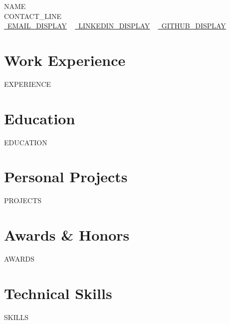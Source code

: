 \documentclass[letterpaper,11pt]{article}
\newcommand{\resumeSubHeadingListStart}{\begin{itemize}[leftmargin=0.0in, label={}]}
\newcommand{\resumeSubHeadingListEnd}{\end{itemize}}
\begin{document}
    \begin{center}
        {\Huge\scshape {{NAME}}}
        \\ {{CONTACT_LINE}}\\
        \small
        \href{{{EMAIL_URL}}}{\raisebox{-0.2\height}\faEnvelope\  \underline{{{EMAIL_DISPLAY}}}} ~
        \href{{{LINKEDIN_URL}}}{\raisebox{-0.2\height}\faLinkedin\ \underline{{{LINKEDIN_DISPLAY}}}}  ~
        \href{{{GITHUB_URL}}}{\raisebox{-0.2\height}\faGithub\ \underline{{{GITHUB_DISPLAY}}}}
    \end{center}

\section{Work Experience}
  \resumeSubHeadingListStart
{{EXPERIENCE}}
  \resumeSubHeadingListEnd

\section{Education}
  \resumeSubHeadingListStart
{{EDUCATION}}
  \resumeSubHeadingListEnd

\section{Personal Projects}
\resumeSubHeadingListStart
{{PROJECTS}}
\resumeSubHeadingListEnd

\section{Awards \& Honors}
\resumeSubHeadingListStart
{{AWARDS}}
\resumeSubHeadingListEnd

\section{Technical Skills}
\vspace{-7pt}
\begin{itemize}
[leftmargin=0.15in, label={}]\small{\item{
{{SKILLS}}
}}
\end{itemize}

\end{document}
